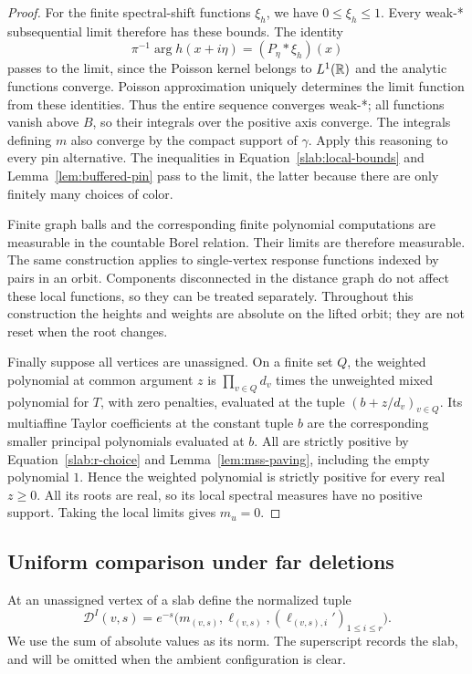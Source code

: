 \begin{proof}
For the finite spectral-shift functions $\xi_h$, we have
$0\leq\xi_h\leq1$. Every weak-* subsequential limit therefore has
these bounds. The identity
\[
 \pi^{-1}\arg h(x+i\eta)=(P_\eta*\xi_h)(x)
\]
passes to the limit, since the Poisson kernel belongs to $L^1(\mathbb R)$
and the analytic functions converge. Poisson approximation uniquely
determines the limit function from these identities. Thus the entire
sequence converges weak-*; all functions vanish above $B$, so their
integrals over the positive axis converge. The integrals defining $m$
also converge by the compact support of $\gamma$. Apply this reasoning
to every pin alternative. The inequalities in
Equation~\eqref{slab:local-bounds} and Lemma~\ref{lem:buffered-pin}
pass to the limit, the latter because there are only finitely many
choices of color.

Finite graph balls and the corresponding finite polynomial
computations are measurable in the countable Borel relation.
Their limits are therefore measurable. The same construction applies
to single-vertex response functions indexed by pairs in an orbit.
Components disconnected in the distance graph do not affect these
local functions, so they can be treated separately. Throughout this
construction the heights and weights are absolute on the lifted
orbit; they are not reset when the root changes.

Finally suppose all vertices are unassigned. On a finite set $Q$,
the weighted polynomial at common argument $z$ is $\prod_{v\in Q}d_v$
times the unweighted mixed polynomial for $T$, with zero penalties,
evaluated at the tuple $(b+z/d_v)_{v\in Q}$. Its multiaffine Taylor
coefficients at the constant tuple $b$ are the corresponding smaller
principal polynomials evaluated at $b$. All are strictly positive by
Equation~\eqref{slab:r-choice} and Lemma~\ref{lem:mss-paving},
including the empty polynomial $1$. Hence the weighted polynomial is
strictly positive for every real $z\geq0$. All its roots are real,
so its local spectral measures have no positive support. Taking the
local limits gives $m_u=0$.
\end{proof}

\subsection{Uniform comparison under far deletions}

At an unassigned vertex of a slab define the normalized tuple
\begin{equation}
 \mathcal D^I(v,s)=e^{-s}
 \bigl(m_{(v,s)},\ell_{(v,s)},
       (\ell_{(v,s),i}')_{1\leq i\leq r}\bigr).
 \label{slab:normalized-data}
\end{equation}
We use the sum of absolute values as its norm. The superscript
records the slab, and will be omitted when the ambient configuration
is clear.

